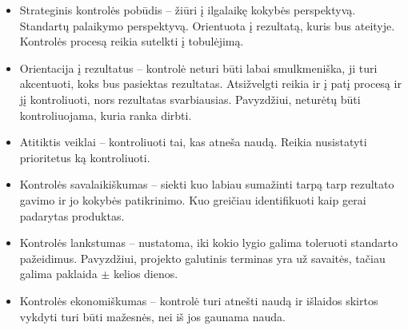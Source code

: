 \begin{itemize}
  \item Strateginis kontrolės pobūdis – žiūri į ilgalaikę
    kokybės perspektyvą. Standartų palaikymo perspektyvą. Orientuota
    į rezultatą, kuris bus ateityje. Kontrolės procesą reikia
    sutelkti į tobulėjimą.
  \item Orientacija į rezultatus – kontrolė neturi būti labai
    smulkmeniška, ji turi akcentuoti, koks bus pasiektas rezultatas.
    Atsižvelgti reikia ir į patį procesą ir jį kontroliuoti, nors
    rezultatas svarbiausias. Pavyzdžiui, neturėtų būti
    kontroliuojama, kuria ranka dirbti.
  \item Atitiktis veiklai – kontroliuoti tai, kas atneša naudą.
    Reikia nusistatyti prioritetus ką kontroliuoti.
  \item Kontrolės savalaikiškumas – siekti kuo labiau sumažinti tarpą
    tarp rezultato gavimo ir jo kokybės patikrinimo. Kuo greičiau
    identifikuoti kaip gerai padarytas produktas.
  \item Kontrolės lankstumas – nustatoma, iki kokio lygio galima toleruoti
    standarto pažeidimus. Pavyzdžiui, projekto galutinis terminas yra už
    savaitės, tačiau galima paklaida $\pm$ kelios dienos.
  \item Kontrolės ekonomiškumas – kontrolė turi atnešti naudą ir
    išlaidos skirtos vykdyti turi būti mažesnės, nei iš jos gaunama
    nauda.
\end{itemize}
